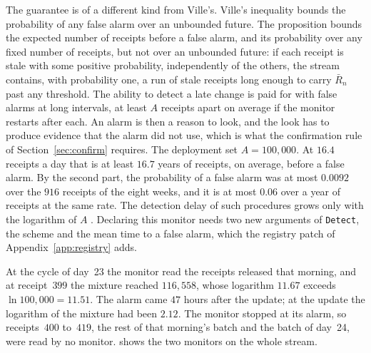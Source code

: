 \documentclass[11pt]{article}
\newcommand{\code}[1]{\texttt{#1}}
\theoremstyle{definition}
\theoremstyle{plain}
\begin{document}
The guarantee is of a different kind from Ville's. Ville's inequality bounds the probability of any
false alarm over an unbounded future. The proposition bounds the expected number of receipts before
a false alarm, and its probability over any fixed number of receipts, but not over an unbounded
future: if each receipt is stale with some positive probability, independently of the others, the
stream contains, with probability one, a run of stale receipts long enough to carry $\bar R_n$ past
any threshold. The ability to detect a late change is paid for with false alarms at long intervals,
at least $A$ receipts apart on average if the monitor restarts after each. An alarm is then a
reason to look, and the look has to produce evidence that the alarm did not use, which is what the
confirmation rule of Section~\ref{sec:confirm} requires. The deployment set $A=100{,}000$. At $16.4$
receipts a day that is at least $16.7$ years of receipts, on average, before a false alarm. By the
second part, the probability of a false alarm was at most $0.0092$ over the $916$ receipts of the
eight weeks, and it is at most $0.06$ over a year of receipts at the same rate. The detection delay
of such procedures grows only with the logarithm of $A$ \cite{lorden,pollak}. Declaring this
monitor needs two new arguments of \code{Detect}, the scheme and the mean time to a false alarm,
which the registry patch of Appendix~\ref{app:registry} adds.

At the cycle of day~23 the monitor read the receipts released that morning, and at receipt~$399$
the mixture reached $116{,}558$, whose logarithm $11.67$ exceeds $\ln 100{,}000=11.51$. The alarm
came $47$ hours after the update; at the update the logarithm of the mixture had been $2.12$. The
monitor stopped at its alarm, so receipts~$400$ to~$419$, the rest of that morning's batch and the
batch of day~24, were read by no monitor.  shows the two monitors on the whole
stream.
\end{document}
